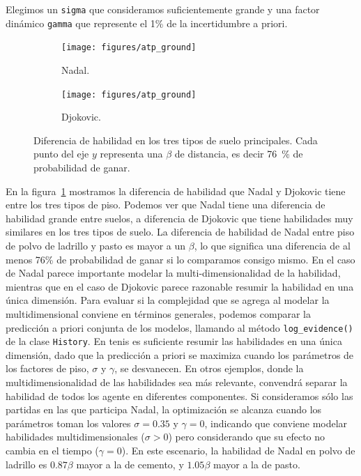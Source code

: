 \documentclass[a4paper,11pt]{book}
\theoremstyle{definition}
\begin{document}
%
Elegimos un \texttt{sigma} que consideramos suficientemente grande y una factor din\'amico \texttt{gamma} que represente el 1\% de la incertidumbre a priori.
\begin{figure}[ht!]
    \centering
    \begin{subfigure}[t]{0.48\textwidth}
    \texttt{[image: figures/atp\_ground]}
    \caption{Nadal.}
    \end{subfigure}
    \begin{subfigure}[t]{0.48\textwidth}
    \texttt{[image: figures/atp\_ground]}
    \caption{Djokovic.}
    \end{subfigure}
    \caption{
    Diferencia de habilidad en los tres tipos de suelo principales.
    Cada punto del eje $y$ representa una $\beta$ de distancia, es decir \SI{76}{\percent} de probabilidad de ganar.
    }
    \label{fig:atp_ground}
\end{figure}
%
En la figura~\ref{fig:atp_ground} mostramos la diferencia de habilidad que Nadal y Djokovic tiene entre los tres tipos de piso.
%
Podemos ver que Nadal tiene una diferencia de habilidad grande entre suelos, a diferencia de Djokovic que tiene habilidades muy similares en los tres tipos de suelo.
%
La diferencia de habilidad de Nadal entre piso de polvo de ladrillo y pasto es mayor a un $\beta$, lo que significa una diferencia de al menos 76\% de probabilidad de ganar si lo comparamos consigo mismo.
%
En el caso de Nadal parece importante modelar la multi-dimensionalidad de la habilidad, mientras que en el caso de Djokovic parece razonable resumir la habilidad en una \'unica dimensi\'on.
%
Para evaluar si la complejidad que se agrega al modelar la multidimensional conviene en t\'erminos generales, podemos comparar la predicci\'on a priori conjunta de los modelos, llamando al m\'etodo \texttt{log\_evidence()} de la clase \texttt{History}.
En tenis es suficiente resumir las habilidades en una \'unica dimensi\'on, dado que la predicci\'on a priori se maximiza cuando los par\'ametros de los factores de piso, $\sigma$ y $\gamma$, se desvanecen.
%
En otros ejemplos, donde la multidimensionalidad de las habilidades sea m\'as relevante, convendr\'a separar la habilidad de todos los agente en diferentes componentes.
%
Si consideramos s\'olo las partidas en las que participa Nadal, la optimizaci\'on se alcanza cuando los par\'ametros toman los valores $\sigma=0.35$ y $\gamma=0$, indicando que conviene modelar habilidades multidimensionales ($\sigma>0$) pero considerando que su efecto no cambia en el tiempo ($\gamma = 0$).
%
En este escenario, la habilidad de Nadal en polvo de ladrillo es $0.87\beta$ mayor a la de cemento, y $1.05\beta$ mayor a la de pasto.
\end{document}

